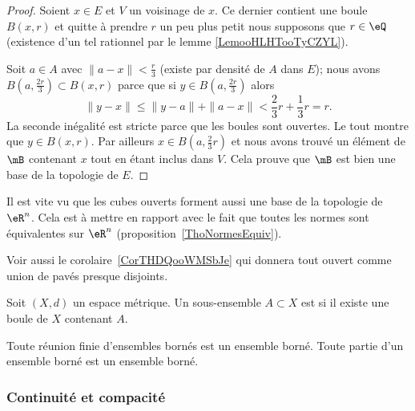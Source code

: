\begin{proof}
    Soient \( x\in E\) et \( V\) un voisinage de \( x\). Ce dernier contient une boule \( B(x,r)\) et quitte à prendre \( r\) un peu plus petit nous supposons que \( r\in \eQ\) (existence d'un tel rationnel par le lemme \ref{LemooHLHTooTyCZYL}).

    Soit \( a\in A\) avec \( \| a-x \|<\frac{ r }{ 3 }\) (existe par densité de \( A\) dans \( E\)); nous avons \( B(a,\frac{ 2r }{ 3 })\subset B(x,r)\) parce que si \( y\in B( a,\frac{ 2r }{ 3 } )\) alors
    \begin{equation}
        \| y-x \|\leq \| y-a \|+\| a-x \|<\frac{ 2 }{ 3 }r+\frac{ 1 }{ 3 }r=r.
    \end{equation}
    La seconde inégalité est stricte parce que les boules sont ouvertes. Le tout montre que \( y\in B(x,r)\). Par ailleurs \( x\in B(a,\frac{ 2 }{ 3 }r)\) et nous avons trouvé un élément de \( \mB\) contenant \( x\) tout en étant inclus dans \( V\). Cela prouve que \( \mB\) est bien une base de la topologie de \( E\).
\end{proof}


\begin{remark}      \label{RemIPVLooHUXyeW}
    Il est vite vu que les cubes ouverts forment aussi une base de la topologie de \( \eR^n\). Cela est à mettre en rapport avec le fait que toutes les normes sont équivalentes sur \( \eR^n\) (proposition~\ref{ThoNormesEquiv}).


    Voir aussi le corolaire~\ref{CorTHDQooWMSbJe} qui donnera tout ouvert comme union de pavés presque disjoints.
\end{remark}

\begin{definition}\label{DefEnsembleBorne}
  Soit \( (X, d) \) un espace métrique. Un sous-ensemble $A \subset X$ est  si il existe une boule de $X$ contenant $A$.
\end{definition}

\begin{proposition}     \label{PROPooJIOAooWqzKMu}
  Toute réunion finie d'ensembles bornés est un ensemble borné. Toute partie d'un ensemble borné est un ensemble borné.
\end{proposition}

\subsubsection{Continuité et compacité}

